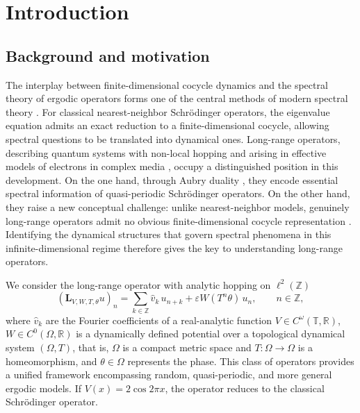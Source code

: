 \documentclass[reqno,11pt]{amsart}
\begin{document}
	\maketitle	

\section{Introduction} \label{main}



\subsection{Background and motivation}

The interplay between finite-dimensional cocycle dynamics and the spectral theory of ergodic operators forms one of the central methods of modern spectral theory \cite{CL,DF,DF2,PF}. For classical nearest-neighbor Schr\"odinger operators, the eigenvalue equation admits an exact reduction to a finite-dimensional cocycle, allowing spectral questions to be translated into dynamical ones.  Long-range operators, describing quantum systems with non-local hopping and arising in effective models of electrons in complex media \cite{AM,Rod,Sar},  occupy a distinguished position in this development. On the one hand, through Aubry duality \cite{AA}, they encode essential spectral information of quasi-periodic Schr\"odinger operators. On the other hand, they raise a new conceptual challenge: unlike nearest-neighbor models, genuinely long-range operators admit no obvious finite-dimensional cocycle representation \cite{GJ}. Identifying the  dynamical structures that govern spectral phenomena in this infinite-dimensional regime therefore gives the key to understanding long-range operators.


We consider the long-range operator with analytic hopping on $\ell^2(\mathbb Z)$
\begin{equation}\label{eq:g}
(\mathbf L_{V, W,T,\theta}u)_n
=\sum_{k\in\mathbb Z}\widehat v_k\,u_{n+k}+\varepsilon W(T^n\theta)\,u_n,\qquad n\in\mathbb Z,
\end{equation}
where $\widehat v_k$ are the Fourier coefficients of a real-analytic function
$V\in C^\omega(\mathbb T,\mathbb R)$, $W\in C^0(\Omega,\mathbb R)$ is a dynamically defined potential over a topological dynamical system $(\Omega,T)$, that is, $\Omega$ is a compact metric space and $T:\Omega\to\Omega$ is a homeomorphism, and  $\theta\in\Omega$ represents the phase. This class of operators provides a unified framework encompassing random, quasi-periodic, and more general ergodic models. If $V(x)=2\cos 2\pi x$, the operator reduces to the classical Schr\"odinger operator.
\end{document}
